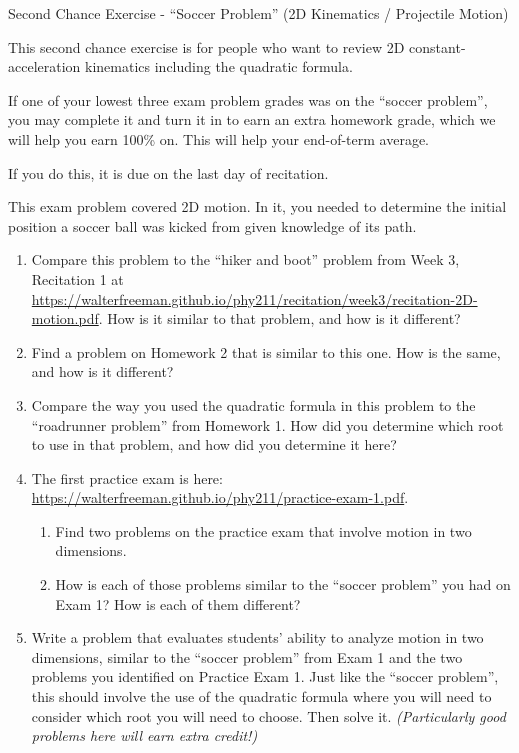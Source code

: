 \documentclass[12pt]{article}
\begin{document}
\begin{center}
\Large
\sc Second Chance Exercise - ``Soccer Problem'' (2D Kinematics / Projectile Motion)\rm





\normalsize
This second chance exercise is for people who want to review 2D constant-acceleration kinematics including the quadratic formula.

If one of your lowest three exam problem grades was on the ``soccer problem'', you may complete it and turn it in to earn an extra homework grade, which we will help you earn 100\% on. This will help your end-of-term average.

If you do this, it is due on the last day of recitation.

\end{center}

\vspace{1.5in}

This exam problem covered 2D motion. In it, you needed to determine the initial position a soccer ball was kicked from given knowledge of its path.

\begin{enumerate}
	\item Compare this problem to the ``hiker and boot'' problem from Week 3, Recitation 1 at \url{https://walterfreeman.github.io/phy211/recitation/week3/recitation-2D-motion.pdf}. How is it similar to that problem, and how is it different?
	
	\item Find a problem on Homework 2 that is similar to this one. How is the same, and how is it different?
	
	\item Compare the way you used the quadratic formula in this problem to the ``roadrunner problem'' from Homework 1. How did you determine which root to use in that problem, and how did you determine it here?
	
	\item The first practice exam is here: \url{https://walterfreeman.github.io/phy211/practice-exam-1.pdf}. 
	\begin{enumerate}
		\item Find two problems on the practice exam that involve motion in two dimensions.
		\item How is each of those problems similar to the ``soccer problem'' you had on Exam 1? How is each of them different?
	\end{enumerate}
    \item Write a problem that evaluates students' ability to analyze motion in two dimensions, similar to the ``soccer problem'' from Exam 1 and the two problems you identified on Practice Exam 1. Just like the ``soccer problem'', this should involve the use of the quadratic formula where you will need to consider which root you will need to choose. Then solve it. {\it (Particularly good problems here will earn extra credit!)}
\end{enumerate}
\end{document}
